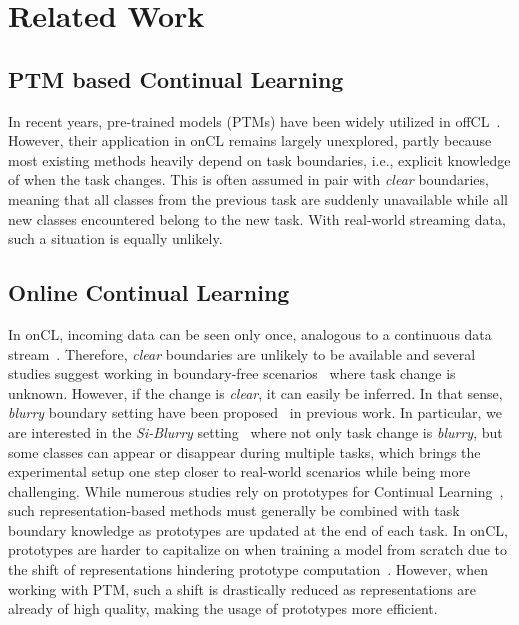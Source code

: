 \section{Related Work}
\label{sec:related}

\subsection{PTM based Continual Learning}
In recent years, pre-trained models (PTMs) have been widely utilized in offCL~\cite{mcdonnell2024ranpac,lin2023pcr,zhou2024ease,smith2023coda,wang2022l2p}. However, their application in onCL remains largely unexplored, partly because most existing methods heavily depend on task boundaries, i.e., explicit knowledge of when the task changes. This is often assumed in pair with \textit{clear} boundaries, meaning that all classes from the previous task are suddenly unavailable while all new classes encountered belong to the new task. With real-world streaming data, such a situation is equally unlikely.

\subsection{Online Continual Learning}
In onCL, incoming data can be seen only once, analogous to a continuous data stream~\cite{He_2020_CVPR}. Therefore, \textit{clear} boundaries are unlikely to be available and several studies suggest working in boundary-free scenarios~\cite{buzzega_dark_2020} where task change is unknown. However, if the change is \textit{clear}, it can easily be inferred. In that sense, \textit{blurry} boundary setting have been proposed~\cite{moon2023mvp,koh_online_2023,bang_online_2022,michel2024rethinking} in previous work. In particular, we are interested in the \textit{Si-Blurry} setting~\cite{moon2023mvp} where not only task change is \textit{blurry}, but some classes can appear or disappear during multiple tasks, which brings the experimental setup one step closer to real-world scenarios while being more challenging. While numerous studies rely on prototypes for Continual Learning~\cite{mcdonnell2024ranpac,lin2023pcr,zhou2024ease}, such representation-based methods must generally be combined with task boundary knowledge as prototypes are updated at the end of each task. In onCL, prototypes are harder to capitalize on when training a model from scratch due to the shift of representations hindering prototype computation~\cite{caccia_new_2022}. However, when working with PTM, such a shift is drastically reduced as representations are already of high quality, making the usage of prototypes more efficient.

